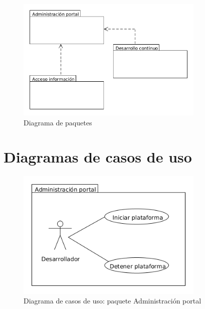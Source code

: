 \begin{figure}[!h]
  \begin{center}
  \includegraphics[width=0.8\textwidth]{imagenes/diagrama_paquetes.png}
  \caption[diagrama_paquetes]{Diagrama de paquetes}
  \label{fig:diagrama_paquetes}
  \end{center}
\end{figure}
 
\section{Diagramas de casos de uso}

\begin{figure}[!h]
  \begin{center}
  \includegraphics[width=0.8\textwidth]{imagenes/diagrama_casos_uso_administracion_portal.png}
  \caption[casos_uso_ap]{Diagrama de casos de uso: paquete Administración portal}
  \label{fig:casos_uso_ap}
  \end{center}
\end{figure}


